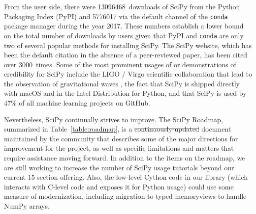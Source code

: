 \documentclass[fleqn,10pt]{wlscirep}
\providecommand{\DIFadd}[1]{{\protect\color{blue}\uwave{#1}}} %
\providecommand{\DIFdel}[1]{{\protect\color{red}\sout{#1}}}                      %
\providecommand{\DIFaddbegin}{} %
\providecommand{\DIFaddend}{} %
\providecommand{\DIFdelbegin}{} %
\providecommand{\DIFdelend}{} %
\begin{document}
From the user side, there were \num{13096468}~downloads of SciPy from the Python
Packaging Index (PyPI)\cite{pypinfo} and \num{5776017} via the default channel of the
\texttt{conda}\cite{condainfo} package manager during the year 2017. These numbers establish a lower
bound on the total number of downloads by users given that
PyPI and \texttt{conda} are only two of several popular methods for installing SciPy.  The SciPy
website\cite{SciPylib}, which has been the default citation in the absence of a
peer-reviewed paper, has been cited over \num{3000}~times\cite{googlescholar}. Some of the most prominent
usages of or demonstrations of credibility for SciPy include the LIGO / Virgo
scientific collaboration that lead to the observation of gravitational waves
\cite{PhysRevLett.116.061102}, the fact that SciPy is shipped directly with
macOS and in the Intel Distribution for Python\cite{intel-python}, and that SciPy is used
by 47\% of all machine learning projects on GitHub\cite{octoverse-scipy}.

Nevertheless, SciPy continually strives to improve.
The SciPy Roadmap\cite{SciPy_roadmap_1,SciPy_roadmap_dev}, summarized in Table~\ref{table:roadmap}, is a
\DIFdelbegin \DIFdel{continuously-updated }\DIFdelend \DIFaddbegin \DIFadd{continually updated }\DIFaddend document
maintained by the community that describes some of the major directions for
improvement for the project, as well as specific limitations and matters that
require assistance moving forward.
In addition to the items on the roadmap,
we are still working to increase the number of SciPy usage tutorials beyond
our current 15 section offering\cite{SciPy_tutorials}.
Also, the low-level Cython code in our library (which interacts with C-level code and
exposes it for Python usage) could use some measure of modernization, including
migration to typed memoryviews to handle NumPy arrays.
\end{document}
